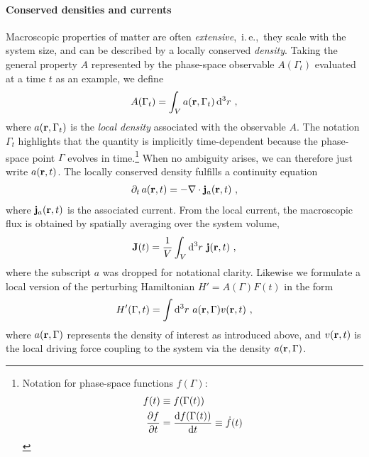 \paragraph{Conserved densities and currents}
Macroscopic properties of matter are often \emph{extensive},~i.\,e.,~they scale with the system size, and can be described by a locally conserved \emph{density}. Taking the general property $A$ represented by the phase-space observable $A(\Gamma_t)$ evaluated at a time $t$ as an example, we define
\begin{align}
  A (\Gamma_t) = \int_V a ({\bf r}, \Gamma_t) \, {\rm d}^3 r~,
  \label{eq:lr.A}
\end{align}
where $a({\bf r}, \Gamma_t)$ is the \emph{local density} associated with the observable $A$. The notation $\Gamma_t$ highlights that the quantity is implicitly time-dependent because the phase-space point $\Gamma$ evolves in time.\footnote{
	Notation for phase-space functions $f (\Gamma)$:
	\begin{align}
	f(t) &\equiv f(\Gamma (t)) \\
	\frac{\partial f}{\partial t} &= \frac{{\rm d} f (\Gamma (t))}{{\rm d} t} \equiv \dot{f}(t)
	\end{align}
	} 
When no ambiguity arises, we can therefore just write $a ({\bf r}, t)$. The locally conserved density fulfills a continuity equation
\begin{align}
  \partial_t \, a({\bf r}, t) = - {\bf \nabla} \cdot {\bf j}_a ({\bf r}, t)~,
  \label{eq:lr.continuity.1}
\end{align}
where ${\bf j}_a ({\bf r}, t)$ is the associated current. From the local current, the macroscopic flux is obtained by spatially averaging over the system volume,
\begin{align}
  {\bf J} (t)
    = \frac{1}{V} \int_V {\rm d}^3 r ~ {\bf j} ({\bf r}, t)~,
  \label{eq:lr.J(t)}
\end{align}
where the subscript $a$ was dropped for notational clarity.
Likewise we formulate a local version of the perturbing Hamiltonian \mbox{$H' = A (\Gamma) F(t)$} in the form
\begin{align}
	H' (\Gamma, t) = \int {\rm d}^3 r ~ a ({\bf r}, \Gamma) v({\bf r}, t)~,
	\label{eq:lr.H'}
\end{align}
where $a({\bf r}, \Gamma)$ represents the density of interest as introduced above, and $v({\bf r}, t)$ is the local driving force coupling to the system via the density $a ({\bf r}, \Gamma)$.

